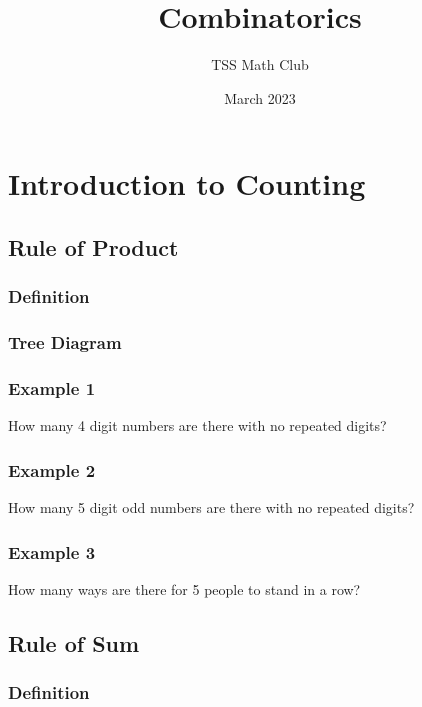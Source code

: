 \documentclass{article}
\title{Combinatorics}
\author{TSS Math Club}
\date{March 2023}
\begin{document}
\large

\maketitle

\section{Introduction to Counting}

\subsection{Rule of Product}

\subsubsection{Definition}
\vspace{20px}
\subsubsection{Tree Diagram}
\vspace{80px}
\subsubsection{Example 1}
How many 4 digit numbers are there with no repeated digits?
\vspace{20px}

\subsubsection{Example 2}
How many 5 digit odd numbers are there with no repeated digits?
\vspace{20px}

\subsubsection{Example 3}
How many ways are there for 5 people to stand in a row?
\vspace{20px}



\subsection{Rule of Sum}

\subsubsection{Definition}
\end{document}
